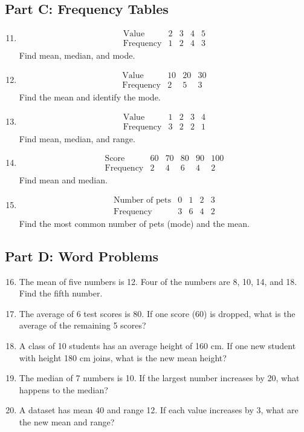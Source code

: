 \documentclass[12pt]{article}
\begin{document}
\subsection*{Part C: Frequency Tables}
\begin{enumerate}
  \setcounter{enumi}{10}
  \item 
  \[
  \begin{array}{c|cccc}
  \text{Value} & 2 & 3 & 4 & 5\\ \hline
  \text{Frequency} & 1 & 2 & 4 & 3
  \end{array}
  \]
  Find mean, median, and mode.

  \item 
  \[
  \begin{array}{c|ccc}
  \text{Value} & 10 & 20 & 30\\ \hline
  \text{Frequency} & 2 & 5 & 3
  \end{array}
  \]
  Find the mean and identify the mode.

  \item 
  \[
  \begin{array}{c|cccc}
  \text{Value} & 1 & 2 & 3 & 4\\ \hline
  \text{Frequency} & 3 & 2 & 2 & 1
  \end{array}
  \]
  Find mean, median, and range.

  \item 
  \[
  \begin{array}{c|ccccc}
  \text{Score} & 60 & 70 & 80 & 90 & 100\\ \hline
  \text{Frequency} & 2 & 4 & 6 & 4 & 2
  \end{array}
  \]
  Find mean and median.

  \item 
  \[
  \begin{array}{c|cccc}
  \text{Number of pets} & 0 & 1 & 2 & 3\\ \hline
  \text{Frequency} & 3 & 6 & 4 & 2
  \end{array}
  \]
  Find the most common number of pets (mode) and the mean.
\end{enumerate}

\subsection*{Part D: Word Problems}
\begin{enumerate}
  \setcounter{enumi}{15}
  \item The mean of five numbers is 12. Four of the numbers are 8, 10, 14, and 18. Find the fifth number.
  \item The average of 6 test scores is 80. If one score (60) is dropped, what is the average of the remaining 5 scores?
  \item A class of 10 students has an average height of 160 cm. If one new student with height 180 cm joins, what is the new mean height?
  \item The median of 7 numbers is 10. If the largest number increases by 20, what happens to the median?
  \item A dataset has mean 40 and range 12. If each value increases by 3, what are the new mean and range?
\end{enumerate}
\end{document}
